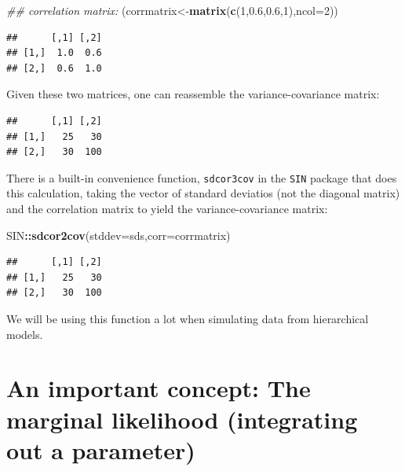 \documentclass[12pt,]{krantz}
\newenvironment{Shaded}{\begin{snugshade}}{\end{snugshade}}
\newcommand{\CommentTok}[1]{\textcolor[rgb]{0.56,0.35,0.01}{\textit{#1}}}
\newcommand{\DataTypeTok}[1]{\textcolor[rgb]{0.13,0.29,0.53}{#1}}
\newcommand{\DecValTok}[1]{\textcolor[rgb]{0.00,0.00,0.81}{#1}}
\newcommand{\FloatTok}[1]{\textcolor[rgb]{0.00,0.00,0.81}{#1}}
\newcommand{\KeywordTok}[1]{\textcolor[rgb]{0.13,0.29,0.53}{\textbf{#1}}}
\newcommand{\NormalTok}[1]{#1}
\newcommand{\OperatorTok}[1]{\textcolor[rgb]{0.81,0.36,0.00}{\textbf{#1}}}
\theoremstyle{definition}
\theoremstyle{definition}
\theoremstyle{definition}
\theoremstyle{remark}
\begin{document}
\begin{Shaded}
\begin{Highlighting}[]
\CommentTok{## correlation matrix:}
\NormalTok{(corrmatrix<-}\KeywordTok{matrix}\NormalTok{(}\KeywordTok{c}\NormalTok{(}\DecValTok{1}\NormalTok{,}\FloatTok{0.6}\NormalTok{,}\FloatTok{0.6}\NormalTok{,}\DecValTok{1}\NormalTok{),}\DataTypeTok{ncol=}\DecValTok{2}\NormalTok{))}
\end{Highlighting}
\end{Shaded}

\begin{verbatim}
##      [,1] [,2]
## [1,]  1.0  0.6
## [2,]  0.6  1.0
\end{verbatim}

Given these two matrices, one can reassemble the variance-covariance matrix:

\begin{Shaded}
\end{Shaded}

\begin{verbatim}
##      [,1] [,2]
## [1,]   25   30
## [2,]   30  100
\end{verbatim}

There is a built-in convenience function, \texttt{sdcor3cov} in the \texttt{SIN} package that does this calculation, taking the vector of standard deviatios (not the diagonal matrix) and the correlation matrix to yield the variance-covariance matrix:

\begin{Shaded}
\begin{Highlighting}[]
\NormalTok{SIN}\OperatorTok{::}\KeywordTok{sdcor2cov}\NormalTok{(}\DataTypeTok{stddev=}\NormalTok{sds,}\DataTypeTok{corr=}\NormalTok{corrmatrix)}
\end{Highlighting}
\end{Shaded}

\begin{verbatim}
##      [,1] [,2]
## [1,]   25   30
## [2,]   30  100
\end{verbatim}

We will be using this function a lot when simulating data from hierarchical models.

\hypertarget{sec:marginal}{%
\section{An important concept: The marginal likelihood (integrating out a parameter)}\label{sec:marginal}}
\end{document}
